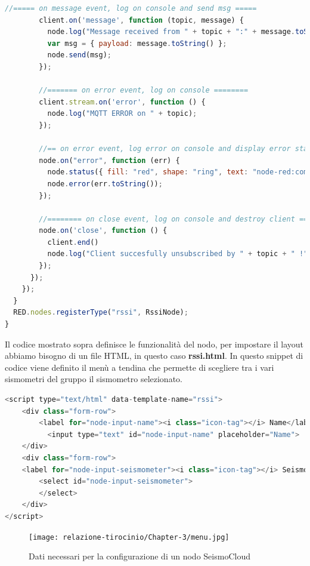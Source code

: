 \documentclass[a4paper,10pt]{memoir}
\begin{document}
\begin{lstlisting}[language=Javascript,firstnumber=60]
        //===== on message event, log on console and send msg =====
        client.on('message', function (topic, message) {
          node.log("Message received from " + topic + ":" + message.toString());
          var msg = { payload: message.toString() };
          node.send(msg);
        });

        //======= on error event, log on console ========
        client.stream.on('error', function () {
          node.log("MQTT ERROR on " + topic);
        });

        //== on error event, log error on console and display error status ==
        node.on("error", function (err) {
          node.status({ fill: "red", shape: "ring", text: "node-red:common.status.error" });
          node.error(err.toString());
        });

        //======== on close event, log on console and destroy client ========
        node.on('close', function () {
          client.end()
          node.log("Client succesfully unsubscribed by " + topic + " !");
        });
      });
    });
  }
  RED.nodes.registerType("rssi", RssiNode);
}
\end{lstlisting}
\clearpage

Il codice mostrato sopra definisce le funzionalità del nodo, per impostare il layout abbiamo bisogno di un file HTML, in questo caso \textbf{rssi.html}.
In questo snippet di codice viene definito il menù a tendina che permette di scegliere tra i vari sismometri del gruppo il sismometro selezionato.
\begin{lstlisting}[language=Javascript,firstnumber=45]
<script type="text/html" data-template-name="rssi">
    <div class="form-row">
        <label for="node-input-name"><i class="icon-tag"></i> Name</label>
          <input type="text" id="node-input-name" placeholder="Name">
    </div>
    <div class="form-row">
    <label for="node-input-seismometer"><i class="icon-tag"></i> Seismometer</label>
        <select id="node-input-seismometer">
        </select>
    </div>
</script>
\end{lstlisting}

\begin{figure}[ht]
    \texttt{[image: relazione-tirocinio/Chapter-3/menu.jpg]}
    \caption{Dati necessari per la configurazione di un nodo SeismoCloud}
    \label{fig:menu}
\end{figure}

\clearpage
\end{document}
